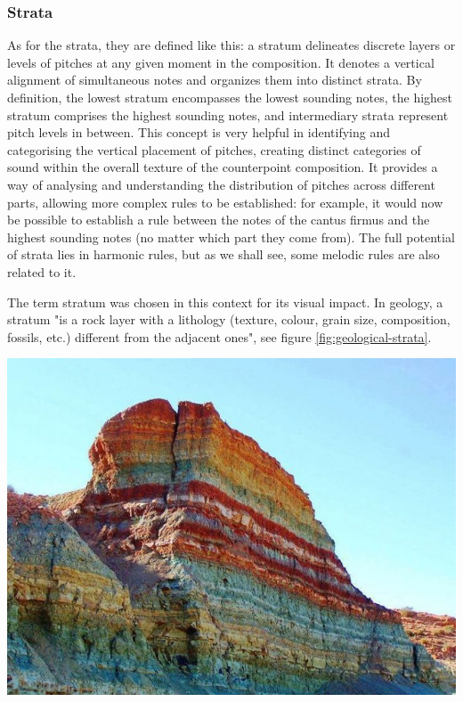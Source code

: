 \subsubsection{Strata}
As for the strata, they are defined like this: a stratum delineates discrete layers or levels of pitches at any given moment in the composition. It denotes a vertical alignment of simultaneous notes and organizes them into distinct strata. By definition, the lowest stratum encompasses the lowest sounding notes, the highest stratum comprises the highest sounding notes, and intermediary strata represent pitch levels in between.
This concept is very helpful in identifying and categorising the vertical placement of pitches, creating distinct categories of sound within the overall texture of the counterpoint composition. It provides a way of analysing and understanding the distribution of pitches across different parts, allowing more complex rules to be established: for example, it would now be possible to establish a rule between the notes of the cantus firmus and the highest sounding notes (no matter which part they come from). The full potential of strata lies in harmonic rules, but as we shall see, some melodic rules are also related to it.

\begin{minipage}{0.6\textwidth}
    The term stratum was chosen in this context for its visual impact. In geology, a stratum "is a rock layer with a lithology (texture, colour, grain size, composition, fossils, etc.) different from the adjacent ones", see figure \ref{fig:geological-strata}.
    \end{minipage}
    \hfill
    \begin{minipage}{0.3\textwidth}
      \centering
      \includegraphics[width=\textwidth]{Images/rainbow-sediment.jpg}
      \label{fig:geological-strata}
\end{minipage}
\vspace{.5cm}

